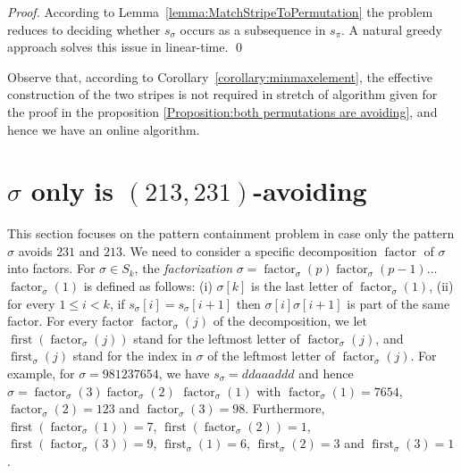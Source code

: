 \documentclass[a4paper]{llncs}
\DeclareMathOperator{\AV}{Av}
\newcommand{\pmotif}{\sigma}
\DeclareMathOperator{\firstia}{first}
\newcommand{\firsti}[2]{\firstia_{{#1}}({#2})}
\DeclareMathOperator{\factora}{factor}
\newcommand{\factor}[2]{\factora_{{#1}}({#2})}
\DeclareMathOperator{\firsta}{first}
\newcommand{\first}[2]{\firsta(\factor{#1}{#2})}
\begin{document}
\begin{proof}
According to Lemma~\ref{lemma:MatchStripeToPermutation} the problem reduces
to deciding whether $s_\sigma$ occurs as a subsequence in $s_\pi$.
A natural greedy approach solves this issue in linear-time.
\qed
\end{proof}

Observe that, according to Corollary~\ref{corollary:minmaxelement},
the effective construction of the two stripes is not required in stretch 
of algorithm given for the proof in the proposition \ref{Proposition:both permutations are avoiding},
and hence we have an online algorithm.


\section{$\sigma$ only is $(213,231)$-avoiding}
\label{section:sigma only avoid 231 and 213}

This section focuses on the pattern containment problem
in case only the pattern $\sigma$ avoids $231$ and $213$.
We need to consider a specific decomposition $\factora$ of $\sigma$ into factors.
For $\sigma \in S_k$, the \emph{factorization}
$\sigma = \factor{\pmotif}{p} \factor{\pmotif}{p-1} \ldots$ $\factor{\pmotif}{1}$
is defined as follows:
(i) $\sigma[k]$ is the last letter of $\factor{\pmotif}{1}$,
(ii) for every $1 \leq i < k$,
if $s_\sigma[i] = s_\sigma[i+1]$ then
$\sigma[i]\sigma[i+1]$ is part of the same factor.
For every factor $\factor{\pmotif}{j}$ of the decomposition, we let
$\first{\pmotif}{j}$ stand for the leftmost letter of $\factor{\pmotif}{j}$,
and $\firsti{\pmotif}{j}$ stand for the index in $\sigma$
of the leftmost letter of $\factor{\pmotif}{j}$.
For example,
for $\sigma = 981237654$,
we have
$s_\sigma = ddaaaddd$ and hence
$\sigma = \factor{\pmotif}{3} \factor{\pmotif}{2}$ $ \factor{\pmotif}{1}$ with
$\factor{\pmotif}{1} =7654$, $\factor{\pmotif}{2} = 123$ and $\factor{\pmotif}{3} = 98$.
Furthermore,
$\first{\pmotif}{1} = 7$, $\first{\pmotif}{2} = 1$, $\first{\pmotif}{3} = 9$,
$\firsti{\pmotif}{1} = 6$, $\firsti{\pmotif}{2} = 3$ and $\firsti{\pmotif}{3} = 1$.
\end{document}
